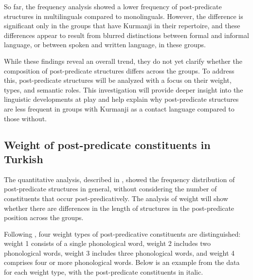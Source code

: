 So far, the frequency analysis showed a lower frequency of post-predicate structures in multilinguals compared to monolinguals. However, the difference is significant only in the groups that have Kurmanji in their repertoire, and these differences appear to result from blurred distinctions between formal and informal language, or between spoken and written language, in these groups.

While these findings reveal an overall trend, they do not yet clarify whether the composition of post-predicate structures differs across the groups. To address this, post-predicate structures will be analyzed with a focus on their weight, types, and semantic roles. This investigation will provide deeper insight into the linguistic developments at play and help explain why post-predicate structures are less frequent in groups with Kurmanji as a contact language compared to those without.

\subsection{Weight of post-predicate constituents in Turkish}\label{sec:key:5.3.1}

The quantitative analysis, described in , showed the frequency distribution of post-predicate structures in general, without considering the number of constituents that occur post-predicatively. The analysis of weight will show whether there are differences in the length of structures in the post-predicate position across the groups.

Following \citet{HaigEtAl2024}, four weight types of post-predicative constituents are distinguished: weight 1 consists of a single phonological word, weight 2 includes two phonological words, weight 3 includes three phonological words, and weight 4 comprises four or more phonological words.  Below is an example from the data for each weight type, with the post-predicate constituents in italic.\\

